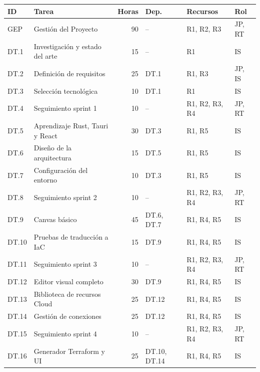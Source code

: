 \documentclass{article}
\begin{document}
{    \begin{table}[H]
    \centering
    \small
    \begin{tabular}{|l|l|r|l|l|l|}
    \hline
    \textbf{ID} & \textbf{Tarea} & \textbf{Horas} & \textbf{Dep.} & \textbf{Recursos} & \textbf{Rol} \\
    \hline
    GEP  & Gestión del Proyecto        & 90 & --                & R1, R2, R3        & JP, RT \\
    \hline
    DT.1  & Investigación y estado del arte     & 15 & --         & R1                & IS \\
    DT.2  & Definición de requisitos            & 25 & DT.1       & R1, R3            & JP, IS \\
    DT.3  & Selección tecnológica               & 10 & DT.1       & R1                & IS \\
    DT.4  & Seguimiento sprint 1                & 10 & --         & R1, R2, R3, R4    & JP, RT \\
    \hline
    DT.5  & Aprendizaje Rust, Tauri y React     & 30 & DT.3       & R1, R5            & IS \\
    DT.6  & Diseño de la arquitectura           & 15 & DT.5       & R1, R5            & IS \\
    DT.7  & Configuración del entorno           & 10 & DT.3       & R1, R5            & IS \\
    DT.8  & Seguimiento sprint 2                & 10 & --         & R1, R2, R3, R4    & JP, RT \\
    \hline
    DT.9  & Canvas básico                       & 45 & DT.6, DT.7 & R1, R4, R5        & IS \\
    DT.10 & Pruebas de traducción a IaC         & 15 & DT.9       & R1, R4, R5        & IS \\
    DT.11 & Seguimiento sprint 3                & 10 & --         & R1, R2, R3, R4    & JP, RT \\
    \hline
    DT.12 & Editor visual completo              & 30 & DT.9       & R1, R4, R5        & IS \\
    DT.13 & Biblioteca de recursos Cloud        & 25 & DT.12      & R1, R4, R5        & IS \\
    DT.14 & Gestión de conexiones               & 25 & DT.12      & R1, R4, R5        & IS \\
    DT.15 & Seguimiento sprint 4                & 10 & --         & R1, R2, R3, R4    & JP, RT \\
    \hline
    DT.16 & Generador Terraform y UI            & 25 & DT.10, DT.14 & R1, R4, R5      & IS \\

\end{tabular}
\end{table}}
\end{document}
